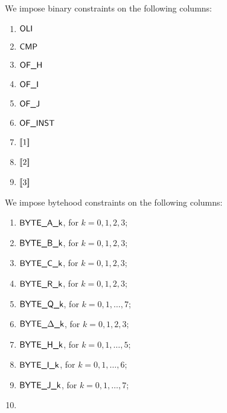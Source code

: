 We impose binary constraints on the following columns:
\begin{multicols}{5}
\begin{enumerate}
	\item $\textsf{OLI}$
	\item $\textsf{CMP}$
	\item $\textsf{OF\_H}$
	\item $\textsf{OF\_I}$
	\item $\textsf{OF\_J}$
	\item $\textsf{OF\_INST}$
	\item $[\![1]\!]$
	\item $[\![2]\!]$
	\item $[\![3]\!]$
\end{enumerate}
\end{multicols}
\noindent {} We impose bytehood constraints on the following columns:
\begin{multicols}{2}
\begin{enumerate}
	\item $\textsf{BYTE}\textsf{\_A\_k}$, for $k=0,1,2,3$;
	\item $\textsf{BYTE}\textsf{\_B\_k}$, for $k=0,1,2,3$;
	\item $\textsf{BYTE}\textsf{\_C\_k}$, for $k=0,1,2,3$;
	\item $\textsf{BYTE}\textsf{\_R\_k}$, for $k=0,1,2,3$;
	\item $\textsf{BYTE}\textsf{\_Q\_k}$, for $k=0,1,\dots,7$;
	\item $\textsf{BYTE}\textsf{\_$\Delta$\_k}$, for $k=0,1,2,3$;
	\item $\textsf{BYTE}\textsf{\_H\_k}$, for $k=0,1,\dots,5$;
	\item $\textsf{BYTE}\textsf{\_I\_k}$, for $k=0,1,\dots,6$;
	\item $\textsf{BYTE}\textsf{\_J\_k}$, for $k=0,1,\dots,7$;
	\item[\vspace{\fill}]
\end{enumerate}
\end{multicols}
